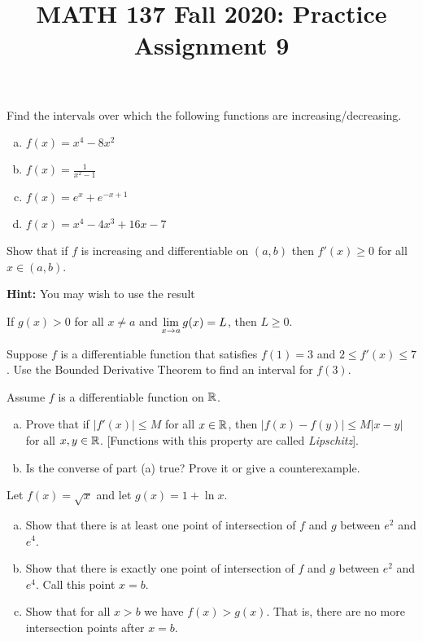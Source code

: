
\title{MATH 137 Fall 2020: Practice Assignment 9}


\thispagestyle{firstpage}
\textbf{\@title}

\question Find the intervals over which the following functions are increasing/decreasing.
\begin{enumerate}[(a)]
  \item $f(x) = x^4 - 8x^2$
  \item $f(x) = \frac{1}{x^2-1}$
  \item $f(x) = e^x + e^{-x+1}$
  \item $f(x) = x^4 - 4x^3 + 16x - 7$
\end{enumerate}


\question Show that if $f$ is increasing and differentiable on $(a,b)$
then $f'(x) \geq 0$ for all $x\in(a,b)$.

\textbf{Hint:} You may wish to use the result \begin{center}
  If $g(x) > 0$ for all $x \neq a$ and $\displaystyle\lim_{x\to a}g(x)=L$, then $L \geq 0$.
\end{center}


\question Suppose $f$ is a differentiable function that satisfies $f(1) = 3$ and $2 \leq f'(x) \leq 7$.
Use the Bounded Derivative Theorem to find an interval for $f(3)$.


\question Assume $f$ is a differentiable function on $\mathbb{R}$.
\begin{enumerate}[(a)]
  \item Prove that if $|f'(x)| \leq M$ for all $x \in \mathbb{R}$,
        then $|f(x) - f(y)| \leq M|x-y|$ for all $x,y\in\mathbb{R}$.
          [Functions with this property are called \emph{Lipschitz}].
  \item Is the converse of part (a) true? Prove it or give a counterexample.
\end{enumerate}


\question Let $f(x) = \sqrt{x}$ and let $g(x) = 1 + \ln x$.
\begin{enumerate}[(a)]
  \item Show that there is at least one point of intersection of $f$ and $g$ between $e^2$ and $e^4$.
  \item Show that there is exactly one point of intersection of $f$ and $g$ between $e^2$ and $e^4$.
        Call this point $x=b$.
  \item Show that for all $x > b$ we have $f(x) > g(x)$.
        That is, there are no more intersection points after $x=b$.
\end{enumerate}


